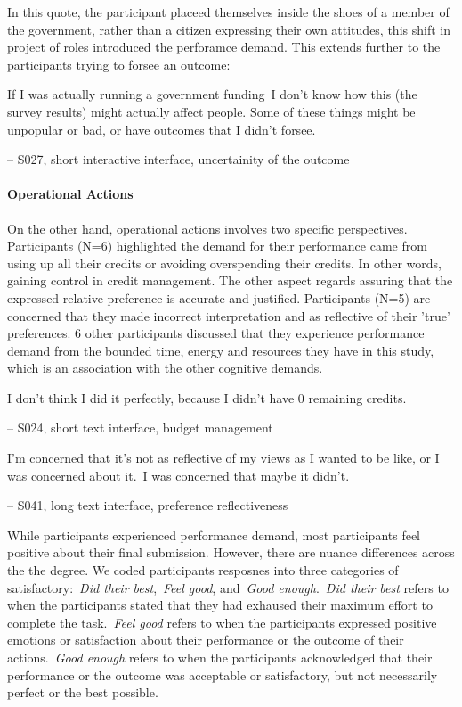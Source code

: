 In this quote, the participant placeed themselves inside the shoes of a member of the government, rather than a citizen expressing their own attitudes, this shift in project of roles introduced the perforamce demand. This extends further to the participants trying to forsee an outcome:

\begin{displayquote}
If I was actually running a government funding~\bracketellipsis I don't know how this (the survey results) might actually affect people. Some of these things might be unpopular or bad, or have outcomes that I didn't forsee.
    
\noindent \hfill -- S027, short interactive interface, uncertainity of the outcome
\end{displayquote}

\paragraph{Operational Actions}
On the other hand, operational actions involves two specific perspectives. Participants (N=6) highlighted the demand for their performance came from using up all their credits or avoiding overspending their credits. In other words, gaining control in credit management. The other aspect regards assuring that the expressed relative preference is accurate and justified. Participants (N=5) are concerned that they made incorrect interpretation and as reflective of their 'true' preferences. $6$ other participants discussed that they experience performance demand from the bounded time, energy and resources they have in this study, which is an association with the other cognitive demands.

\begin{displayquote}
I don't think I did it perfectly, because I didn't have 0 remaining credits.
    
\noindent \hfill -- S024, short text interface, budget management
\end{displayquote}

\begin{displayquote}
I'm concerned that it's not as reflective of my views as I wanted to be like, or I was concerned about it.~\bracketellipsis I was concerned that maybe it didn't.

\noindent \hfill -- S041, long text interface, preference reflectiveness
\end{displayquote}

While participants experienced performance demand, most participants feel positive about their final submission. However, there are nuance differences across the the degree. We coded participants resposnes into three categories of satisfactory:~\textit{Did their best},~\textit{Feel good}, and~\textit{Good enough}.~\textit{Did their best} refers to when the participants stated that they had exhaused their maximum effort to complete the task.~\textit{Feel good} refers to when the participants expressed positive emotions or satisfaction about their performance or the outcome of their actions.~\textit{Good enough} refers to when the participants acknowledged that their performance or the outcome was acceptable or satisfactory, but not necessarily perfect or the best possible.

